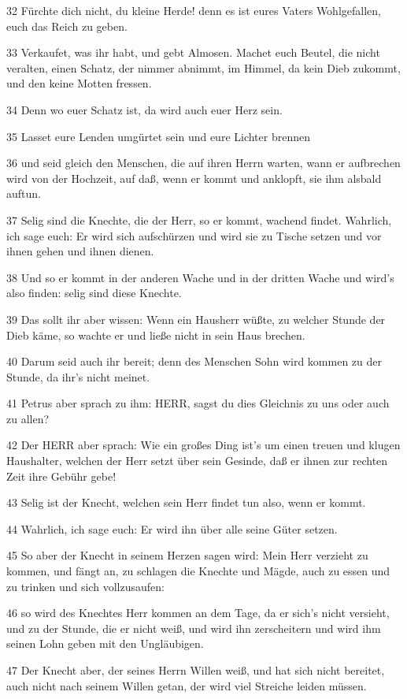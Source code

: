 \par 32 Fürchte dich nicht, du kleine Herde! denn es ist eures Vaters Wohlgefallen, euch das Reich zu geben.
\par 33 Verkaufet, was ihr habt, und gebt Almosen. Machet euch Beutel, die nicht veralten, einen Schatz, der nimmer abnimmt, im Himmel, da kein Dieb zukommt, und den keine Motten fressen.
\par 34 Denn wo euer Schatz ist, da wird auch euer Herz sein.
\par 35 Lasset eure Lenden umgürtet sein und eure Lichter brennen
\par 36 und seid gleich den Menschen, die auf ihren Herrn warten, wann er aufbrechen wird von der Hochzeit, auf daß, wenn er kommt und anklopft, sie ihm alsbald auftun.
\par 37 Selig sind die Knechte, die der Herr, so er kommt, wachend findet. Wahrlich, ich sage euch: Er wird sich aufschürzen und wird sie zu Tische setzen und vor ihnen gehen und ihnen dienen.
\par 38 Und so er kommt in der anderen Wache und in der dritten Wache und wird's also finden: selig sind diese Knechte.
\par 39 Das sollt ihr aber wissen: Wenn ein Hausherr wüßte, zu welcher Stunde der Dieb käme, so wachte er und ließe nicht in sein Haus brechen.
\par 40 Darum seid auch ihr bereit; denn des Menschen Sohn wird kommen zu der Stunde, da ihr's nicht meinet.
\par 41 Petrus aber sprach zu ihm: HERR, sagst du dies Gleichnis zu uns oder auch zu allen?
\par 42 Der HERR aber sprach: Wie ein großes Ding ist's um einen treuen und klugen Haushalter, welchen der Herr setzt über sein Gesinde, daß er ihnen zur rechten Zeit ihre Gebühr gebe!
\par 43 Selig ist der Knecht, welchen sein Herr findet tun also, wenn er kommt.
\par 44 Wahrlich, ich sage euch: Er wird ihn über alle seine Güter setzen.
\par 45 So aber der Knecht in seinem Herzen sagen wird: Mein Herr verzieht zu kommen, und fängt an, zu schlagen die Knechte und Mägde, auch zu essen und zu trinken und sich vollzusaufen:
\par 46 so wird des Knechtes Herr kommen an dem Tage, da er sich's nicht versieht, und zu der Stunde, die er nicht weiß, und wird ihn zerscheitern und wird ihm seinen Lohn geben mit den Ungläubigen.
\par 47 Der Knecht aber, der seines Herrn Willen weiß, und hat sich nicht bereitet, auch nicht nach seinem Willen getan, der wird viel Streiche leiden müssen.

